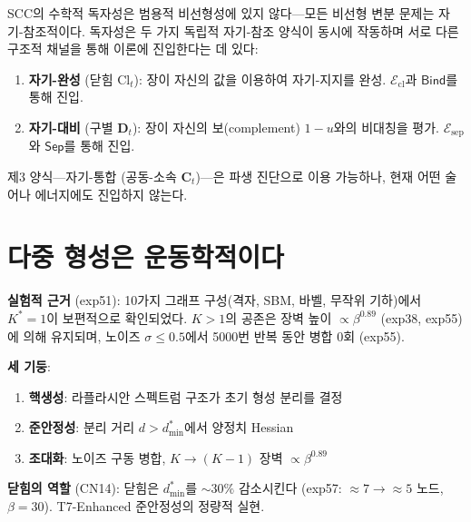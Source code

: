 SCC의 수학적 독자성은 범용적 비선형성에 있지 않다---모든 비선형 변분 문제는 자기-참조적이다. 독자성은 두 가지 독립적 자기-참조 양식이 동시에 작동하며 서로 다른 구조적 채널을 통해 이론에 진입한다는 데 있다:

\begin{enumerate}
    \item \textbf{자기-완성} (닫힘 $\mathrm{Cl}_t$): 장이 자신의 값을 이용하여 자기-지지를 완성. $\mathcal{E}_{\mathrm{cl}}$과 $\mathsf{Bind}$를 통해 진입.
    \item \textbf{자기-대비} (구별 $\mathbf{D}_t$): 장이 자신의 보(complement) $1{-}u$와의 비대칭을 평가. $\mathcal{E}_{\mathrm{sep}}$와 $\mathsf{Sep}$를 통해 진입.
\end{enumerate}

제3 양식---자기-통합 (공동-소속 $\mathbf{C}_t$)---은 파생 진단으로 이용 가능하나, 현재 어떤 술어나 에너지에도 진입하지 않는다.


\section{다중 형성은 운동학적이다}
\label{app:cn-kinetic}

\begin{center}
\end{center}

\textbf{실험적 근거} (exp51): 10가지 그래프 구성(격자, SBM, 바벨, 무작위 기하)에서 $K^* = 1$이 보편적으로 확인되었다. $K > 1$의 공존은 장벽 높이 $\propto \beta^{0.89}$ (exp38, exp55)에 의해 유지되며, 노이즈 $\sigma \leq 0.5$에서 5000번 반복 동안 병합 0회 (exp55).

\textbf{세 기둥}:
\begin{enumerate}
    \item \textbf{핵생성}: 라플라시안 스펙트럼 구조가 초기 형성 분리를 결정
    \item \textbf{준안정성}: 분리 거리 $d > d_{\min}^*$에서 양정치 Hessian
    \item \textbf{조대화}: 노이즈 구동 병합, $K \to (K{-}1)$ 장벽 $\propto \beta^{0.89}$
\end{enumerate}

\textbf{닫힘의 역할} (CN14): 닫힘은 $d_{\min}^*$를 $\sim 30\%$ 감소시킨다 (exp57: $\approx 7 \to \approx 5$ 노드, $\beta = 30$). T7-Enhanced 준안정성의 정량적 실현.
